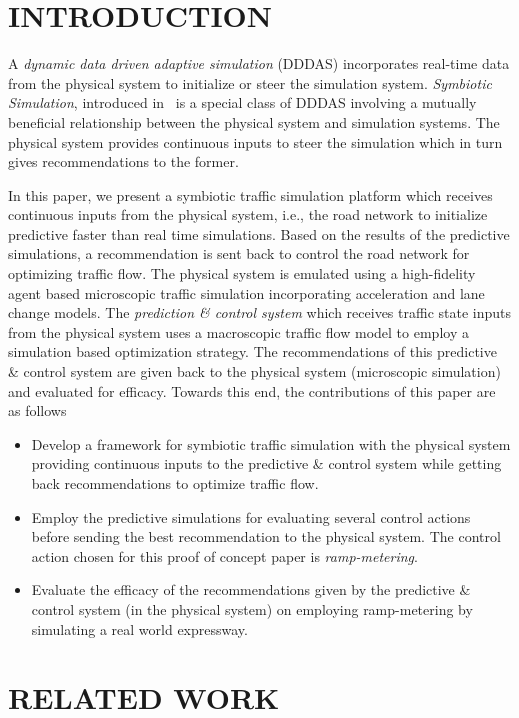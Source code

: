 \documentclass{wscpaperproc}
\theoremstyle{wsc}
\begin{document}
\section{INTRODUCTION}
\label{sec:intro}


A  {\it dynamic data driven adaptive simulation} (DDDAS) incorporates real-time data from the physical system to initialize or steer the simulation system. {\it Symbiotic Simulation}, introduced in~ is a special class of DDDAS involving a mutually beneficial relationship between the physical system and simulation systems. The physical system  provides continuous inputs to steer the simulation which in turn gives recommendations to the former.

In this paper, we present a symbiotic traffic simulation platform which receives continuous inputs from the physical system, i.e., the road network to initialize predictive faster than real time simulations. Based on the results of the predictive simulations, a recommendation is sent back to control the road network for optimizing traffic flow. The physical system is emulated using a high-fidelity agent based microscopic traffic simulation incorporating acceleration and lane change models. The {\it prediction \& control system} which receives traffic state inputs from the physical system uses a macroscopic traffic flow model to employ a simulation based optimization strategy. The recommendations of this predictive \& control system are given back to the physical system (microscopic simulation) and evaluated for efficacy. Towards this end, the contributions of this paper are as follows

\begin{itemize}
\item Develop a framework for symbiotic traffic simulation with the physical system providing continuous inputs to the predictive \& control system while getting back recommendations to optimize traffic flow.
\item Employ the predictive simulations for evaluating several control actions before sending the best recommendation to the physical system. The control action chosen for this proof of concept paper is {\it ramp-metering}.
\item Evaluate the efficacy of the recommendations given by the predictive \& control system (in the physical system) on employing ramp-metering by simulating a real world expressway.
\end{itemize}


\section{RELATED WORK}
\end{document}
